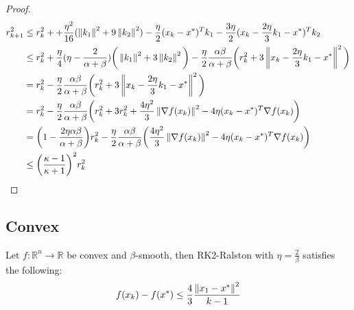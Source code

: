 \begin{proof}
\begin{align*}
r_{k + 1}^{2} & \leq r_{k}^{2} + + \frac{\eta^{2}}{16}( \norm{k_{1}}^{2} + 9 \norm{k_{2}}^{2}) - \frac{\eta}{2}(x_{k} - x^{*})^{T} k_{1} - \frac{3\eta}{2}(x_{k} - \frac{2 \eta}{3}k_{1} - x^{*})^{T}  k_{2}\\
& \leq r_{k}^{2} + \frac{\eta}{4}(\eta - \frac{2}{\alpha + \beta}) \bigg(\norm{k_{1}}^{2} + 3\norm{k_{2}}^{2} \bigg) - \frac{\eta}{2}\frac{\alpha \beta}{\alpha + \beta} \bigg(r_{k}^{2} + 3\norm{x_{k} - \frac{2 \eta}{3} k_{1} - x^{*}}^{2}\bigg)  \\
&= r_{k}^{2} - \frac{\eta}{2}\frac{\alpha \beta}{\alpha + \beta} \bigg(r_{k}^{2} + 3\norm{x_{k} - \frac{2 \eta}{3} k_{1} - x^{*}}^{2}\bigg) \\
&= r_{k}^{2} - \frac{\eta}{2}\frac{\alpha \beta}{\alpha + \beta} \bigg( r_{k}^{2} + 3 r_{k}^{2} + \frac{4 \eta^{2}}{3} \norm{\nabla f(x_k)}^{2} - 4 \eta (x_{k} - x^{*})^{T} \nabla f(x_{k}) \bigg) \\
&=  \bigg( 1 -  \frac{2 \eta \alpha \beta}{\alpha + \beta} \bigg) r_{k}^{2} - \frac{\eta}{2}\frac{\alpha \beta}{\alpha + \beta} \bigg( \frac{4 \eta^{2}}{3} \norm{\nabla f(x_k)}^{2} - 4 \eta (x_{k} - x^{*})^{T} \nabla f(x_{k}) \bigg) \\
& \leq \bigg(\frac{\kappa - 1}{\kappa + 1}\bigg)^{2} r_{k}^{2} %
\end{align*}


\end{proof}


\subsection{Convex}
\begin{theorem}\label{rk2 ralston convex}
Let $f: \mathbb{R}^{n} \rightarrow \mathbb{R}$ be convex and $\beta$-smooth, then RK2-Ralston with $\eta = \frac{2}{\beta}$ satisfies the following:
\begin{align}
f(x_{k}) - f(x^{*}) \leq  \frac{4}{3} \frac{\left\lVert x_{1} - x^{*}\right\rVert^{2}}{k - 1}
\end{align}
\end{theorem}

